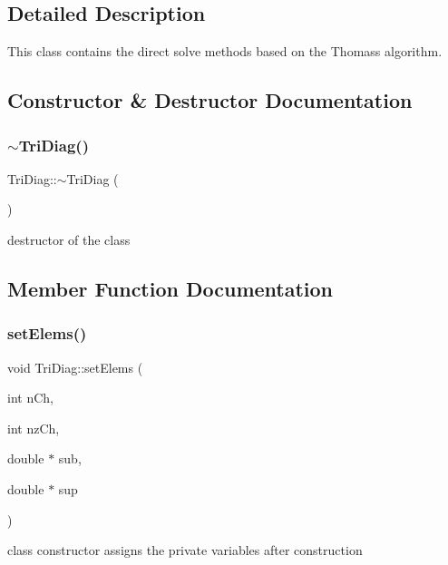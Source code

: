 \subsection{Detailed Description}
This class contains the direct solve methods based on the Thomas\textquotesingle{}s algorithm. 

\subsection{Constructor \& Destructor Documentation}
\mbox{\label{classTriDiag_a24c305b51d97fa6b0e3fda43d0b54d20}} 
\subsubsection{\texorpdfstring{$\sim$\+Tri\+Diag()}{~TriDiag()}}
{\footnotesize\ttfamily Tri\+Diag\+::$\sim$\+Tri\+Diag (\begin{DoxyParamCaption}{ }\end{DoxyParamCaption})}

destructor of the class 

\subsection{Member Function Documentation}
\mbox{\label{classTriDiag_ae024466ef1fb6844f5983f3f9d4ef467}} 
\subsubsection{\texorpdfstring{set\+Elems()}{setElems()}}
{\footnotesize\ttfamily void Tri\+Diag\+::set\+Elems (\begin{DoxyParamCaption}\item[{int}]{n\+Ch,  }\item[{int}]{nz\+Ch,  }\item[{double $\ast$}]{sub,  }\item[{double $\ast$}]{sup }\end{DoxyParamCaption})}

class constructor assigns the private variables after construction \mbox{\label{classTriDiag_a0fd3201443c200db98a9070f61cfff5c}} 
